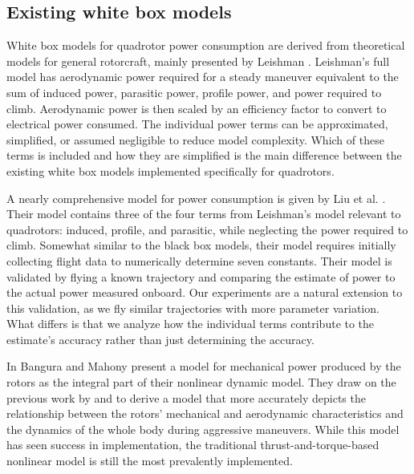 
\subsection{Existing white box models}
White box models for quadrotor power consumption are derived from theoretical models for general rotorcraft, mainly presented by Leishman \cite{leishman2006principles}. Leishman's full model has aerodynamic power required for a steady maneuver equivalent to the sum of induced power, parasitic power, profile power, and power required to climb. Aerodynamic power is then scaled by an efficiency factor to convert to electrical power consumed. The individual power terms can be approximated, simplified, or assumed negligible to reduce model complexity. Which of these terms is included and how they are simplified is the main difference between the existing white box models implemented specifically for quadrotors. 

A nearly comprehensive model for power consumption is given by Liu et al. \cite{liu2017power}. Their model contains three of the four terms from Leishman's model relevant to quadrotors: induced, profile, and parasitic, while neglecting the power required to climb. Somewhat similar to the black box models, their model requires initially collecting flight data to numerically determine seven constants. Their model is validated by flying a known trajectory and comparing the estimate of power to the actual power measured onboard. Our experiments are a natural extension to this validation, as we fly similar trajectories with more parameter variation. What differs is that we analyze how the individual terms contribute to the estimate's accuracy rather than just determining the accuracy.

In \cite{bangura2012nonlinear} Bangura and Mahony present a model for mechanical power produced by the rotors as the integral part of their nonlinear dynamic model. They draw on the previous work by \cite{leishman2006principles} and \cite{hoffmann2007quadrotor} to derive a model that more accurately depicts the relationship between the rotors' mechanical and aerodynamic characteristics and the dynamics of the whole body during aggressive maneuvers. While this model has seen success in implementation, the traditional thrust-and-torque-based nonlinear model is still the most prevalently implemented.

